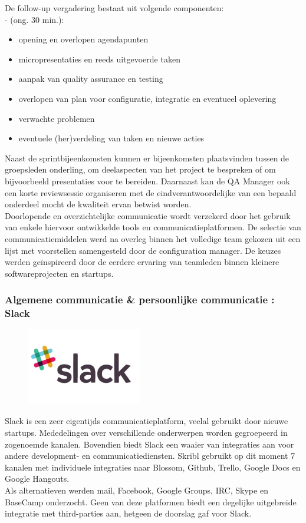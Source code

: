 \documentclass{article}
\begin{document}
\noindent De follow-up vergadering bestaat uit volgende componenten:\\
- (ong. 30 min.):
\begin{itemize}
\item opening en overlopen agendapunten
\item micropresentaties en reeds uitgevoerde taken
\item aanpak van quality assurance en testing 
\item overlopen van plan voor configuratie, integratie en eventueel oplevering
\item verwachte problemen 
\item eventuele (her)verdeling van taken en nieuwe acties 
\end{itemize}

\noindent  Naast de sprintbijeenkomsten kunnen er bijeenkomsten plaatsvinden tussen de groepsleden onderling, om deelaspecten van het project te bespreken of om bijvoorbeeld presentaties voor te bereiden. Daarnaast kan de QA Manager ook een korte reviewsessie organiseren met de eindverantwoordelijke van een bepaald onderdeel mocht de kwaliteit ervan betwist worden. \\

Doorlopende en overzichtelijke communicatie wordt verzekerd door het gebruik van enkele hiervoor ontwikkelde tools en communicatieplatformen. De selectie van communicatiemiddelen werd na overleg binnen het volledige team gekozen uit een lijst met voorstellen samengesteld door de configuration manager. De keuzes werden ge\"{i}nspireerd door de eerdere ervaring van teamleden binnen kleinere softwareprojecten en startups. 

\subsubsection*{Algemene communicatie \& persoonlijke communicatie : Slack}
\begin{figure}[h!]
\centering
 \includegraphics[width=50mm]{slack.png}
\end{figure}

\noindent Slack is een zeer eigentijds communicatieplatform, veelal gebruikt door nieuwe startups. Mededelingen over verschillende onderwerpen worden gegroepeerd in zogenoemde kanalen. Bovendien biedt Slack een waaier van integraties aan voor andere development- en communicatiediensten. Skribl gebruikt op dit moment 7 kanalen met individuele integraties naar Blossom, Github, Trello, Google Docs en Google Hangouts.\\
\noindent  Als alternatieven werden mail, Facebook, Google Groups, IRC, Skype en BaseCamp onderzocht. Geen van deze platformen biedt een degelijke uitgebreide integratie met third-parties aan, hetgeen de doorslag gaf voor Slack.
\end{document}
